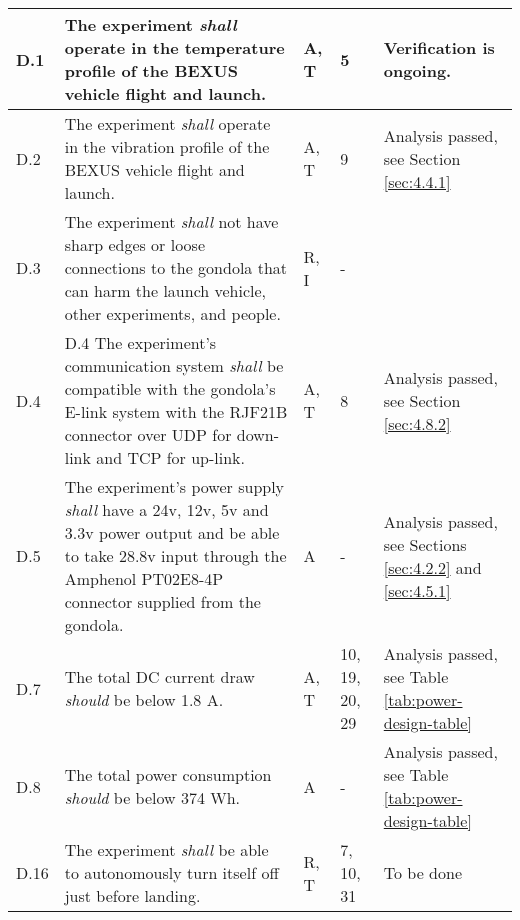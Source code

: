 \begin{longtable}[]{|m{}| m{} |m{} |m{}|m{}|}
D.1  & The experiment \textit{shall} operate in the temperature profile of the BEXUS vehicle flight and launch.\cite{BexusManual}                                                                         &       A, T       & 5            & Verification is ongoing.     \\ \hline
D.2  & The experiment \textit{shall} operate in the vibration profile of the BEXUS vehicle flight and launch.\cite{BexusManual}                                                                          &       A, T       & 9            &  Analysis passed, see Section \ref{sec:4.4.1}       \\ \hline
D.3  & The experiment \textit{shall} not have sharp edges or loose connections to the gondola that can harm the launch vehicle, other experiments, and people.                                                                                                           &      R, I      & -          &        \\ \hline %
D.4  & 
    \item[D.4] The experiment's communication system \textit{shall} be compatible with the gondola's E-link system with the RJF21B connector over UDP for down-link and TCP for up-link.                                                                             &      A, T        & 8            &    Analysis passed, see Section \ref{sec:4.8.2}    \\ \hline
D.5  & The experiment's power supply \textit{shall} have a 24v, 12v, 5v and 3.3v power output and be able to take 28.8v input through the Amphenol PT02E8-4P connector supplied from the gondola.                                                                                    &      A       &  -           & Analysis passed, see Sections \ref{sec:4.2.2} and \ref{sec:4.5.1}      \\ \hline
D.7  & The total DC current draw \textit{should} be below 1.8 A. &      A, T        & 10, 19, 20, 29            & Analysis passed, see Table \ref{tab:power-design-table}        \\ \hline
D.8  & The total power consumption \textit{should} be below 374 Wh.& A & - & Analysis passed, see Table \ref{tab:power-design-table} \\ \hline
D.16 & The experiment \textit{shall} be able to autonomously turn itself off just before landing.                                                                                       &       R, T      &  7, 10, 31           &    To be done    \\ \hline

\end{longtable}
